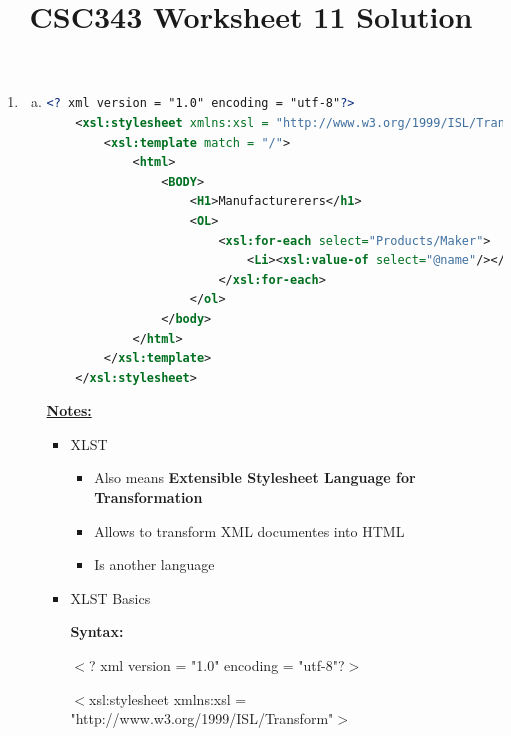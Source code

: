 \documentclass[12pt]{article}
\begin{document}
\title{CSC343 Worksheet 11 Solution}
\maketitle

\begin{enumerate}[1.]
    \item

    \begin{enumerate}[a)]
        \item

    \begin{lstlisting}[language=XML]
    <? xml version = "1.0" encoding = "utf-8"?>
    <xsl:stylesheet xmlns:xsl = "http://www.w3.org/1999/ISL/Transform">
        <xsl:template match = "/">
            <html>
                <BODY>
                    <H1>Manufacturerers</h1>
                    <OL>
                        <xsl:for-each select="Products/Maker">
                            <Li><xsl:value-of select="@name"/></li>
                        </xsl:for-each>
                    </ol>
                </body>
            </html>
        </xsl:template>
    </xsl:stylesheet>
    \end{lstlisting}


        \bigskip

        \underline{\textbf{Notes:}}

        \bigskip

        \begin{itemize}
            \item XLST
            \begin{itemize}
                \item Also means \textbf{Extensible Stylesheet Language for Transformation}
                \item Allows to transform XML documentes into HTML
                \item Is another language
            \end{itemize}
            \item XLST Basics

            \bigskip

            \textbf{Syntax:}

            \bigskip

            $<$? xml version = "1.0" encoding = "utf-8"?$>$

            $<$xsl:stylesheet xmlns:xsl = "http://www.w3.org/1999/ISL/Transform"$>$


\end{itemize}
\end{enumerate}
\end{enumerate}
\end{document}
